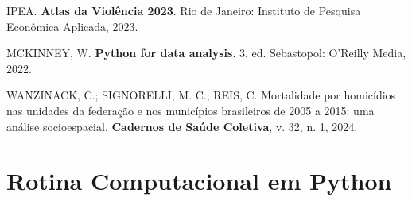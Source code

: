 \documentclass[12pt,a4paper]{article}
\begin{document}
\begin{description}
\item IPEA. \textbf{Atlas da Violência 2023}. Rio de Janeiro: Instituto de Pesquisa Econômica Aplicada, 2023.

\item MCKINNEY, W. \textbf{Python for data analysis}. 3. ed. Sebastopol: O'Reilly Media, 2022.

\item WANZINACK, C.; SIGNORELLI, M. C.; REIS, C. Mortalidade por homicídios nas unidades da federação e nos municípios brasileiros de 2005 a 2015: uma análise socioespacial. \textbf{Cadernos de Saúde Coletiva}, v. 32, n. 1, 2024.
\end{description}

\newpage

\appendix
\section{Rotina Computacional em Python}
\label{ap:codigo}
\end{document}

